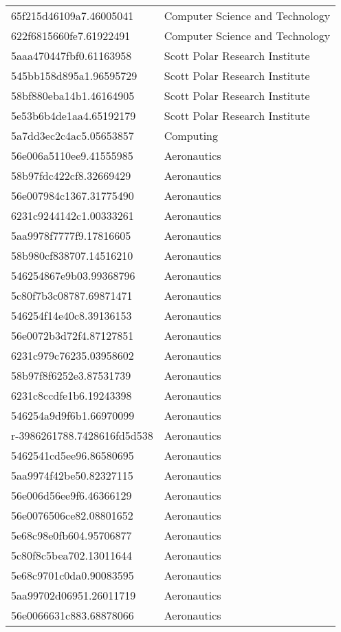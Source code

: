 \begin{tabular}{ll}
65f215d46109a7.46005041 & Computer Science and Technology \\
622f6815660fe7.61922491 & Computer Science and Technology \\
5aaa470447fbf0.61163958 & Scott Polar Research Institute \\
545bb158d895a1.96595729 & Scott Polar Research Institute \\
58bf880eba14b1.46164905 & Scott Polar Research Institute \\
5e53b6b4de1aa4.65192179 & Scott Polar Research Institute \\
5a7dd3ec2c4ac5.05653857 & Computing \\
56e006a5110ee9.41555985 & Aeronautics \\
58b97fdc422cf8.32669429 & Aeronautics \\
56e007984c1367.31775490 & Aeronautics \\
6231c9244142c1.00333261 & Aeronautics \\
5aa9978f7777f9.17816605 & Aeronautics \\
58b980cf838707.14516210 & Aeronautics \\
546254867e9b03.99368796 & Aeronautics \\
5c80f7b3c08787.69871471 & Aeronautics \\
546254f14e40c8.39136153 & Aeronautics \\
56e0072b3d72f4.87127851 & Aeronautics \\
6231c979c76235.03958602 & Aeronautics \\
58b97f8f6252e3.87531739 & Aeronautics \\
6231c8ccdfe1b6.19243398 & Aeronautics \\
546254a9d9f6b1.66970099 & Aeronautics \\
r-3986261788.7428616fd5d538 & Aeronautics \\
5462541cd5ee96.86580695 & Aeronautics \\
5aa9974f42be50.82327115 & Aeronautics \\
56e006d56ee9f6.46366129 & Aeronautics \\
56e0076506ce82.08801652 & Aeronautics \\
5e68c98e0fb604.95706877 & Aeronautics \\
5c80f8c5bea702.13011644 & Aeronautics \\
5e68c9701c0da0.90083595 & Aeronautics \\
5aa99702d06951.26011719 & Aeronautics \\
56e0066631c883.68878066 & Aeronautics \\

\end{tabular}
